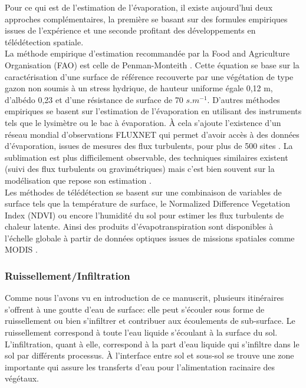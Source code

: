Pour ce qui est de l'estimation de l'évaporation, il existe aujourd'hui deux approches complémentaires, la première se basant sur des formules empiriques issues de l'expérience et une seconde profitant des développements en télédétection spatiale.\\
La méthode empirique d'estimation recommandée par la Food and Agriculture Organisation (FAO) \citep{allen1998} est celle de Penman-Monteith \citep{monteith1965}. Cette équation se base sur la caractérisation d'une surface de référence recouverte par une végétation de type gazon non soumis à un stress hydrique, de hauteur uniforme égale 0,12 m, d'albédo 0,23 et d'une résistance de surface de 70 $s.m^{-1}$. D'autres méthodes empiriques se basent sur l'estimation de l'évaporation en utilisant des instruments tels que le lysimètre ou le bac à évaporation. À cela s'ajoute l'existence d'un réseau mondial d'observations FLUXNET qui permet d'avoir accès à des données d'évaporation, issues de mesures des flux turbulents, pour plus de 500 sites \citep{baldocchi2001}. La sublimation est plus difficilement observable, des techniques similaires existent (suivi des flux turbulents ou gravimétriques) mais c'est bien souvent sur la modélisation que repose son estimation \citep{macdonald2010,groot2013}.\\
Les méthodes de télédétection se basent sur une combinaison de variables de surface tels que la température de surface, le Normalized Difference Vegetation Index (NDVI) ou encore l'humidité du sol pour estimer les flux turbulents de chaleur latente. Ainsi des produits d'évapotranspiration sont disponibles à l'échelle globale à partir de données optiques issues de missions spatiales comme MODIS \citep[Moderate-Resolution Imaging Spectroradiometer,][]{salomonson2002}.
\clearpage
\subsubsection{{\selectfont Ruissellement/Infiltration}}
\label{sec:ruissellement}

Comme nous l'avons vu en introduction de ce manuscrit, plusieurs itinéraires s'offrent à une goutte d'eau de surface: elle peut s'écouler sous forme de ruissellement ou bien s'infiltrer et contribuer aux écoulements de sub-surface. Le ruissellement correspond à toute l'eau liquide s'écoulant à la surface du sol. L'infiltration, quant à elle, correspond à la part d'eau liquide qui s'infiltre dans le sol par différents processus. À l'interface entre sol et sous-sol se trouve une zone importante qui assure les transferts d'eau pour l'alimentation racinaire des végétaux.\\

